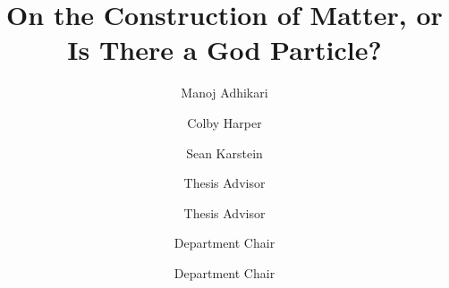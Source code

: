 \documentclass{scu-thesis}
\author{Manoj Adhikari}
\author{Colby Harper}
\author{Sean Karstein}
\title{On the Construction of Matter, or Is There a God Particle?}
\begin{document}
\frontmatter
\signature{Thesis Advisor}
\signature{Thesis Advisor}
\signature{Department Chair}
\signature{Department Chair}

\maketitle


\tableofcontents
\listoffigures

\mainmatter




















\backmatter
\end{document}
